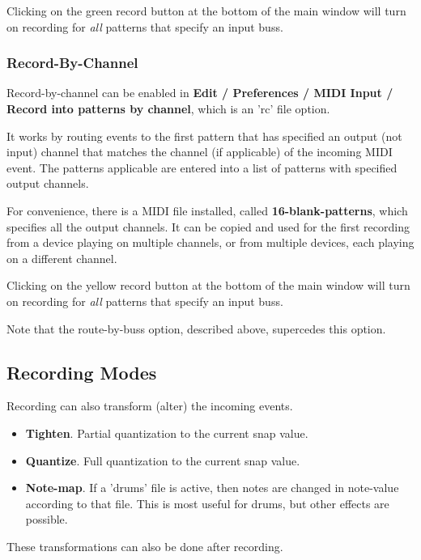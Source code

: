    Clicking on the green record button at the bottom of the main window
   will turn on recording for \textsl{all}
   patterns that specify an input buss.

\subsubsection{Record-By-Channel}
\label{subsubsec:recording_record_by_channel}

   Record-by-channel can be enabled in
   \textbf{Edit / Preferences / MIDI Input / Record into patterns by
   channel}, which is an 'rc' file option.

   It works by routing events to the first pattern that has specified an 
   output (not input) channel that matches the channel (if applicable) of
   the incoming MIDI event.
   The patterns applicable are entered into a list of patterns with specified
   output channels.

   For convenience, there is a MIDI file installed, called
   \textbf{16-blank-patterns}, which specifies all the output channels.
   It can be copied and used for the first recording from a device
   playing on multiple channels, or from multiple devices, each playing
   on a different channel.

   Clicking on the yellow record button at the bottom of the main window
   will turn on recording for \textsl{all}
   patterns that specify an input buss.

   Note that the route-by-buss option, described above, supercedes this
   option.

\subsection{Recording Modes}
\label{sec:recording_modes}

   Recording can also transform (alter) the incoming events.

   \begin{itemize}
      \item \textbf{Tighten}.
         Partial quantization to the current snap value.
      \item \textbf{Quantize}.
         Full quantization to the current snap value.
      \item \textbf{Note-map}.
         If a 'drums' file is active, then notes are changed
         in note-value according to that file.
         This is most useful for drums, but other effects are possible.
   \end{itemize}

   These transformations can also be done after recording.

